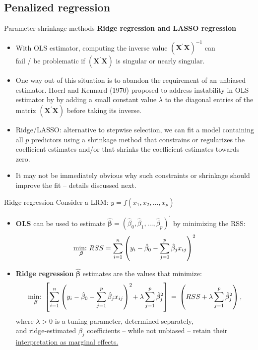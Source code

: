 \documentclass{beamer}
\begin{document}
\subsection{Penalized regression}
\begin{frame}{Parameter shrinkage methods}
\textbf{Ridge regression and LASSO regression}
\small
\medskip
\begin{itemize}
\item With OLS estimator, computing the inverse value $(\bm{X}^{\prime}\bm{X})^{-1}$ can \\ fail / be problematic if $(\bm{X}^{\prime}\bm{X})$ is singular or nearly singular. 
\medskip
\item One way out of this situation is to abandon the requirement of an unbiased estimator. Hoerl and Kennard (1970) proposed to address instability in OLS estimator by by adding a small constant value $\lambda$ to the diagonal entries of the matrix 
$(\bm{X}^{\prime}\bm{X})$ before taking its inverse.
\medskip
\item Ridge/LASSO: alternative to stepwise selection, we can fit a model containing all $p$ predictors using a shrinkage method that constrains or regularizes the coefficient estimates and/or that shrinks the coefficient estimates towards zero.
\medskip
\item It may not be immediately obvious why such constraints or shrinkage
should improve the fit -- details discussed next.
\end{itemize}
\end{frame}
\begin{frame}{Ridge regression}
\small
Consider a LRM: $y = f( x_1, x_2, \dots , x_p)$
\smallskip
\begin{itemize}
\item \textbf{OLS} can be used to estimate $\bm{\hat{\beta}}=(\hat{\beta}_0, \hat{\beta}_1, \dots , \hat{\beta}_p)^{\prime}$ by minimizing the RSS:
$$\underset{\bm{\beta}}{\textnormal{min:~}} RSS = \sum_{i=1}^n \left(y_i - \hat{\beta}_0 
         - \sum_{j=1}^p  \hat{\beta}_j x_{ij}      \right)^2 $$
\bigskip
\item \textbf{Ridge regression} $\bm{\hat{\beta}}$ estimates 
are the values that minimize:
$$\underset{\bm{\beta}}{\textnormal{min:~}} \left[ \sum_{i=1}^n \left(y_i - \hat{\beta}_0  - \sum_{j=1}^p  \hat{\beta}_j x_{ij} \right)^2 
\! + \lambda \sum_{j=1}^p  \hat{\beta}_j^2 \right]
\, = \, \left( RSS + \lambda \sum_{j=1}^p  \hat{\beta}_j^2 \right),$$
where $\lambda > 0$ is a tuning parameter, determined separately,\\
and ridge-estimated $\beta_j$ coefficients -- while not unbiased -- retain their 
\textcolor{blue}{\underline{\href{https://online.stat.psu.edu/stat508/lesson/5/5.1}{interpretation as marginal effects.}}}
\end{itemize}
\end{frame}
\end{document}

